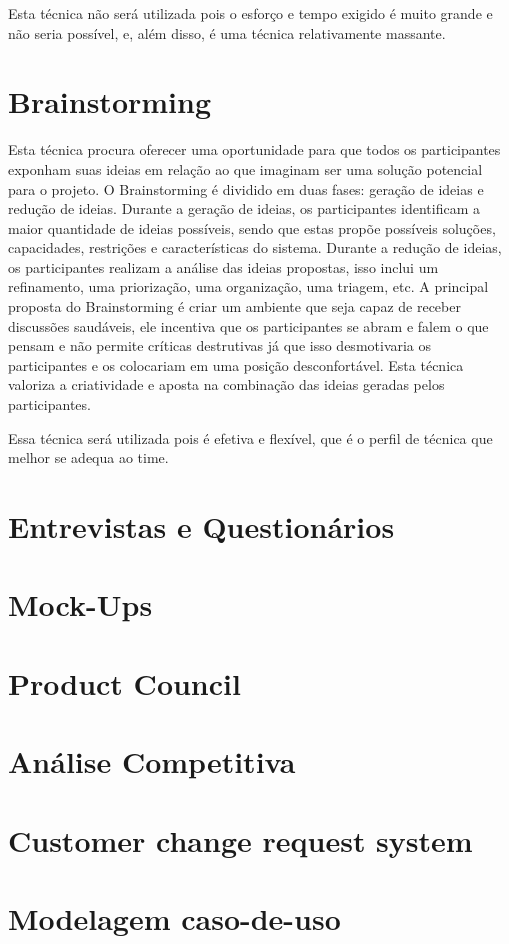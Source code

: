 Esta técnica não será utilizada pois o esforço e tempo exigido é muito grande e não seria possível, e, além disso, é uma técnica relativamente massante.

\section{Brainstorming}
Esta técnica procura oferecer uma oportunidade para que todos os participantes exponham suas ideias em relação ao que imaginam ser uma solução potencial para o projeto. O Brainstorming é dividido em duas fases: geração de ideias e redução de ideias. Durante a geração de ideias, os participantes identificam a maior quantidade de ideias possíveis, sendo que estas propõe possíveis soluções, capacidades, restrições e características do sistema. Durante a redução de ideias, os participantes realizam a análise das ideias propostas, isso inclui um refinamento, uma priorização, uma organização, uma triagem, etc.
A principal proposta do Brainstorming é criar um ambiente que seja capaz de receber discussões saudáveis, ele incentiva que os participantes se abram e falem o que pensam e não permite críticas destrutivas já que isso desmotivaria os participantes e os colocariam em uma posição desconfortável. Esta técnica valoriza a criatividade e aposta na combinação das ideias geradas pelos participantes.

Essa técnica será utilizada pois é efetiva e flexível, que é o perfil de técnica que melhor se adequa ao time.

\section{Entrevistas e Questionários}

\section{Mock-Ups}

\section{Product Council}

\section{Análise Competitiva}

\section{Customer change request system}

\section{Modelagem caso-de-uso}
